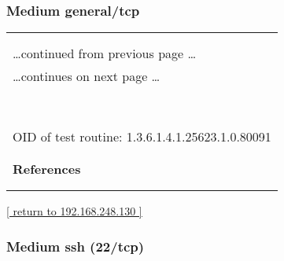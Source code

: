 \documentclass{article}
\begin{document}

\subsubsection{Medium general/tcp}
\label{port:192.168.248.130 general/tcp Medium}

\begin{longtable}{|p{}|}
\hline
\rowcolor{openvas_warning}{\color{white}{Medium (CVSS: 2.6) }}\\
\rowcolor{openvas_warning}{\color{white}{NVT: TCP timestamps}}\\
\hline
\endfirsthead
\hfill\ldots continued from previous page \ldots \\
\hline
\endhead
\hline
\ldots continues on next page \ldots \\
\endfoot
\hline
\endlastfoot
\\
\rowcolor{white}{\verb=It was detected that the host implements RFC1323.=}\\
\rowcolor{white}{\verb=The following timestamps were retrieved with a delay of 1 seconds in-between:=}\\
\rowcolor{white}{\verb=Paket 1: 721791790=}\\
\rowcolor{white}{\verb=Paket 2: -351001889=}\\
\rowcolor{white}{\verb==}\\
\rowcolor{white}{\verb==}\\
\\
OID of test routine: 1.3.6.1.4.1.25623.1.0.80091\\
\\

      \hline
      \\
\textbf{References}\\
\rowcolor{white}{\verb=Other:=}\\
\rowcolor{white}{\verb=  URL:http://www.ietf.org/rfc/rfc1323.txt=}\\
\end{longtable}

\begin{footnotesize}\hyperref[host:192.168.248.130]{[ return to 192.168.248.130 ]}\end{footnotesize}
\subsubsection{Medium ssh (22/tcp)}
\label{port:192.168.248.130 ssh (22/tcp) Medium}
\end{document}
